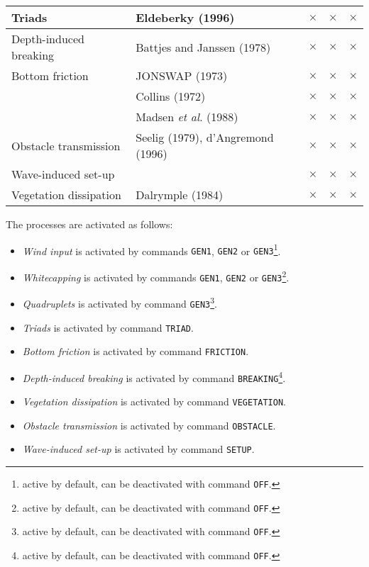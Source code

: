 \documentclass[12pt]{book}
\begin{document}
\begin{table}[htb]
\begin{center}
\begin{tabular}{|l | l | c | c | c|}
\hline
Triads                  & Eldeberky (1996)                       & $\times$ & $\times$ & $\times$ \\
\hline
Depth-induced breaking  & Battjes and Janssen (1978)             & $\times$ & $\times$ & $\times$ \\
\hline
Bottom friction         & JONSWAP (1973)                         & $\times$ & $\times$ & $\times$ \\
\cline{2-5}
                        & Collins (1972)                         & $\times$ & $\times$ & $\times$ \\
\cline{2-5}
                        & Madsen {\it et al}. (1988)             & $\times$ & $\times$ & $\times$ \\
\hline
Obstacle transmission   & Seelig (1979), d'Angremond (1996)      & $\times$ & $\times$ & $\times$ \\
\hline
Wave-induced set-up     &                                        & $\times$ & $\times$ & $\times$ \\
\hline
Vegetation dissipation  & Dalrymple (1984)                       & $\times$ & $\times$ & $\times$ \\
\hline
\end{tabular}
\end{center}
\end{table}
\noindent
The processes are activated as follows:
\begin{itemize}
  \item {\it Wind input} is activated by commands {\tt GEN1}, {\tt GEN2} or {\tt GEN3}\footnote{active by default, can be deactivated with command {\tt OFF}.}.
  \item {\it Whitecapping} is activated by commands {\tt GEN1}, {\tt GEN2} or {\tt GEN3}\footnote{active by default, can be deactivated with command {\tt OFF}.}.
  \item {\it Quadruplets} is activated by command {\tt GEN3}\footnote{active by default, can be deactivated with command {\tt OFF}.}.
  \item {\it Triads} is activated by command {\tt TRIAD}.
  \item {\it Bottom friction} is activated by command {\tt FRICTION}.
  \item {\it Depth-induced breaking} is activated by command {\tt BREAKING}\footnote{active by default, can be deactivated with command {\tt OFF}.}.
  \item {\it Vegetation dissipation} is activated by command {\tt VEGETATION}.
  \item {\it Obstacle transmission} is activated by command {\tt OBSTACLE}.
  \item {\it Wave-induced set-up} is activated by command {\tt SETUP}.
\end{itemize}
\end{document}
